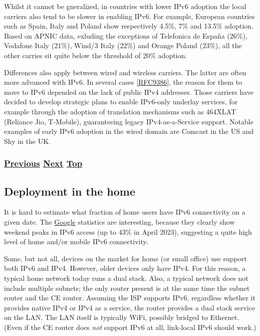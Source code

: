 \documentclass[
]{article}
\begin{document}
Whilst it cannot be gneralized, in countries with lower IPv6 adoption
the local carriers also tend to be slower in enabling IPv6. For example,
European countries such as Spain, Italy and Poland show respectively
4.5\%, 7\% and 13.5\% adoption. Based on APNIC data, exluding the
exceptions of Telefonica de España (26\%), Vodafone Italy (21\%), Wind/3
Italy (22\%) and Orange Poland (23\%), all the other carries sit quite
below the threshold of 20\% adoption.

Differences also apply between wired and wireless carriers. The latter
are often more advanced with IPv6. In several cases
{[}\href{https://www.rfc-editor.org/info/rfc9386}{RFC9386}{]}, the
reason for them to move to IPv6 depended on the lack of public IPv4
addresses. Those carriers have decided to develop strategic plans to
enable IPv6-only underlay services, for example through the adoption of
translation mechanisms such as 464XLAT (Reliance Jio, T-Mobile),
guaranteeing legacy IPv4-as-a-Service support. Notable examples of early
IPv6 adoption in the wired domain are Comcast in the US and Sky in the
UK.

\subsubsection{\texorpdfstring{\hyperref[status]{Previous}
\hyperref[deployment-in-the-home]{Next}
\hyperref[deployment-status]{Top}}{Previous Next Top}}\label{previous-next-top-35}

\pagebreak

\subsection{Deployment in the home}\label{deployment-in-the-home}

It is hard to estimate what fraction of home users have IPv6
connectivity on a given date. The
\href{https://www.google.com/intl/en/ipv6/statistics.html}{Google}
statistics are interesting, because they clearly show weekend peaks in
IPv6 access (up to 43\% in April 2023), suggesting a quite high level of
home and/or mobile IPv6 connectivity.

Some, but not all, devices on the market for home (or small office) use
support both IPv6 and IPv4. However, older devices only have IPv4. For
this reason, a typical home network today runs a dual stack. Also, a
typical network does not include multiple subnets; the only router
present is at the same time the subnet router and the CE router.
Assuming the ISP supports IPv6, regardless whether it provides native
IPv4 or IPv4 as a service, the router provides a dual stack service on
the LAN. The LAN itself is typically WiFi, possibly bridged to Ethernet.
(Even if the CE router does \emph{not} support IPv6 at all, link-local
IPv6 should work.)
\end{document}
